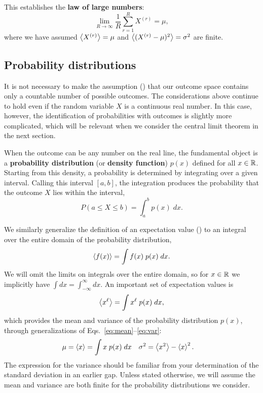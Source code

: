 \begin{shaded}
  This establishes the \textbf{law of large numbers}:
  \begin{equation}
    \lim_{R \to \infty} \frac{1}{R} \sum_{r = 1}^R X^{(r)} = \mu,
  \end{equation}
  where we have assumed $\left\langle X^{(r)} \right\rangle = \mu$ and $\left\langle (X^{(r)} - \mu)^2 \right\rangle = \sigma^2$ are finite.
\end{shaded}



\subsection{\label{sec:probdist}Probability distributions}
It is not necessary to make the assumption () that our outcome space contains only a countable number of possible outcomes.
The considerations above continue to hold even if the random variable $X$ is a continuous real number.
In this case, however, the identification of probabilities with outcomes is slightly more complicated, which will be relevant when we consider the central limit theorem in the next section.

When the outcome can be any number on the real line, the fundamental object is a \textbf{probability distribution} (or \textbf{density function}) $p(x)$ defined for all $x \in \mathbb R$.
Starting from this density, a probability is determined by integrating over a given interval.
Calling this interval $[a, b]$, the integration produces the probability that the outcome $X$ lies within the interval,
\begin{equation*}
  P\left(a \leq X \leq b\right) = \int_a^b p(x) \; dx.
\end{equation*}

We similarly generalize the definition of an expectation value () to an integral over the entire domain of the  probability distribution,
\begin{equation*}
  \left\langle f(x) \right\rangle = \int f(x) \; p(x) \; dx.
\end{equation*}
We will omit the limits on integrals over the entire domain, so for $x \in \mathbb R$ we implicitly have $\int dx = \int_{-\infty}^{\infty} dx$.
An important set of expectation values is
\begin{equation}
  \label{eq:expect_cont}
  \left\langle x^{\ell} \right\rangle = \int x^{\ell} \; p(x) \; dx,
\end{equation}
which provides the mean and variance of the probability distribution $p(x)$, through generalizations of Eqs.~\ref{eq:mean}--\ref{eq:var}:
\begin{align}
  \label{eq:mean_var}
  \mu   & = \left\langle x \right\rangle = \int x \; p(x) \; dx &
  \sigma^2 & = \left\langle x^2 \right\rangle - \left\langle x \right\rangle^2.
\end{align}
The expression for the variance should be familiar from your determination of the standard deviation in an earlier gap.
Unless stated otherwise, we will assume the mean and variance are both finite for the probability distributions we consider.



